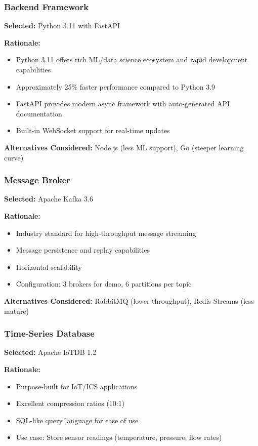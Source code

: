 \documentclass[12pt,a4paper]{article}
\begin{document}
\subsubsection{Backend Framework}

\textbf{Selected:} Python 3.11 with FastAPI

\textbf{Rationale:}
\begin{itemize}[leftmargin=1cm,itemsep=0pt]
    \item Python 3.11 offers rich ML/data science ecosystem and rapid development capabilities
    \item Approximately 25\% faster performance compared to Python 3.9
    \item FastAPI provides modern async framework with auto-generated API documentation
    \item Built-in WebSocket support for real-time updates
\end{itemize}

\textbf{Alternatives Considered:} Node.js (less ML support), Go (steeper learning curve)

\subsubsection{Message Broker}

\textbf{Selected:} Apache Kafka 3.6

\textbf{Rationale:}
\begin{itemize}[leftmargin=1cm,itemsep=0pt]
    \item Industry standard for high-throughput message streaming
    \item Message persistence and replay capabilities
    \item Horizontal scalability
    \item Configuration: 3 brokers for demo, 6 partitions per topic
\end{itemize}

\textbf{Alternatives Considered:} RabbitMQ (lower throughput), Redis Streams (less mature)

\subsubsection{Time-Series Database}

\textbf{Selected:} Apache IoTDB 1.2

\textbf{Rationale:}
\begin{itemize}[leftmargin=1cm,itemsep=0pt]
    \item Purpose-built for IoT/ICS applications
    \item Excellent compression ratios (10:1)
    \item SQL-like query language for ease of use
    \item Use case: Store sensor readings (temperature, pressure, flow rates)
\end{itemize}
\end{document}
